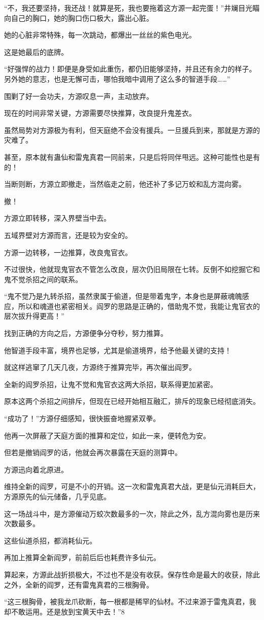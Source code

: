 \begin{this_body}
“不，我还要坚持，我还战！就算是死，我也要拖着这方源一起完蛋！”井斓目光瞄向自己的胸口，她的胸口伤口极大，露出心脏。

她的心脏非常特殊，每一次跳动，都爆出一丝丝的紫色电光。

这是她最后的底牌。

“好强悍的战力！即便是身受如此重伤，都仍旧能够坚持，并且还有余力的样子。另外她的意志，也是无懈可击，哪怕我暗中调用了这么多的智道手段……”

围剿了好一会功夫，方源叹息一声，主动放弃。

现在的时间非常关键，方源需要尽快推算，改良提升鬼差衣。

虽然局势对方源极为有利，但天庭绝不会没有援兵。一旦援兵到来，那就是方源的灾难了。

甚至，原本就有蛊仙和雷鬼真君一同前来，只是后将同伴甩远。这种可能性也是有的！

当断则断，方源立即撤走，当然临走之前，他还补了多记万蛟和乱方混向雾。

撤！

方源立即转移，深入界壁当中去。

五域界壁对方源而言，还是较为安全的。

方源一边转移，一边推算，改良鬼官衣。

不过很快，他就现鬼官衣不管怎么改良，层次仍旧局限在七转。反倒不如挖掘它和鬼不觉杀招之间的联系。

“鬼不觉乃是九转杀招，虽然隶属于偷道，但是带着鬼字，本身也是屏蔽魂魄感应，所以和魂道也紧密相关。阎罗的思路是正确的，借助鬼不觉，我能让鬼官衣的层次拔升得更高！”

找到正确的方向之后，方源便争分夺秒，努力推算。

他智道手段丰富，境界也足够，尤其是偷道境界，给予他最关键的支持！

就这样逃窜了几天几夜，方源终于推算完毕，再次催出阎罗。

全新的阎罗杀招，让鬼不觉和鬼官衣这两大杀招，联系得更加紧密。

原本这两个杀招之间排斥，但现在已经开始相互融汇，排斥的现象已经彻底消失。

“成功了！”方源仔细感知，很快振奋地握紧双拳。

他再一次屏蔽了天庭方面的推算和定位，如此一来，便转危为安。

但若是撤销阎罗的话，他就会再次暴露在天庭的测算中。

方源迅向着北原进。

维持全新的阎罗，可是不小的开销。这一次和雷鬼真君大战，更是仙元消耗巨大，方源原先的仙元储备，几乎见底。

这一场战斗中，是方源催动万蛟次数最多的一次，除此之外，乱方混向雾也是历来次数最多。

这些仙道杀招，都消耗仙元。

再加上推算全新阎罗，前前后后也耗费许多仙元。

算起来，方源此战折损极大，不过也不是没有收获。保存性命是最大的收获，除此之外，全新的阎罗，还有雷鬼真君的三根胸骨。

“这三根胸骨，被我龙爪砍断，每一根都是稀罕的仙材。不过来源于雷鬼真君，我却不敢运用。还是放到宝黄天中去！”8

\end{this_body}

